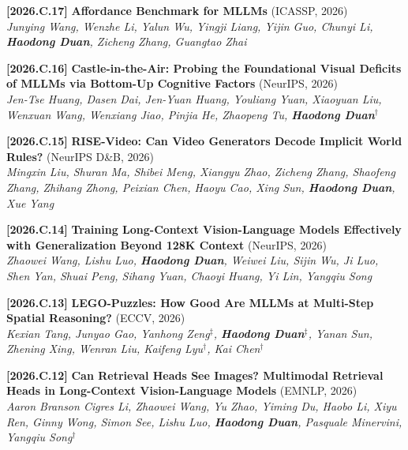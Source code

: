 \documentclass{resume}
\newcommand{\itemgap}{\vspace{-1mm}}%
\begin{document}
\textbf{[2026.C.17]} \textbf{Affordance Benchmark for MLLMs} (ICASSP, 2026) \\
\textit{Junying Wang, Wenzhe Li, Yalun Wu, Yingji Liang, Yijin Guo, Chunyi Li, \textbf{Haodong Duan}, Zicheng Zhang, Guangtao Zhai} \\

\itemgap

\textbf{[2026.C.16]} \textbf{Castle-in-the-Air: Probing the Foundational Visual Deficits of MLLMs via Bottom-Up Cognitive Factors} (NeurIPS, 2026) \\
\textit{Jen-Tse Huang, Dasen Dai, Jen-Yuan Huang, Youliang Yuan, Xiaoyuan Liu, Wenxuan Wang, Wenxiang Jiao, Pinjia He, Zhaopeng Tu, \textbf{Haodong Duan$^\dag$}} \\

\itemgap

\textbf{[2026.C.15]} \textbf{RISE-Video: Can Video Generators Decode Implicit World Rules?} (NeurIPS D\&B, 2026) \\
\textit{Mingxin Liu, Shuran Ma, Shibei Meng, Xiangyu Zhao, Zicheng Zhang, Shaofeng Zhang, Zhihang Zhong, Peixian Chen, Haoyu Cao, Xing Sun, \textbf{Haodong Duan}, Xue Yang} \\

\itemgap

\textbf{[2026.C.14]} \textbf{Training Long-Context Vision-Language Models Effectively with Generalization Beyond 128K Context} (NeurIPS, 2026) \\
\textit{Zhaowei Wang, Lishu Luo, \textbf{Haodong Duan}, Weiwei Liu, Sijin Wu, Ji Luo, Shen Yan, Shuai Peng, Sihang Yuan, Chaoyi Huang, Yi Lin, Yangqiu Song} \\

\itemgap

\textbf{[2026.C.13]} \textbf{LEGO-Puzzles: How Good Are MLLMs at Multi-Step Spatial Reasoning?} (ECCV, 2026) \\
\textit{Kexian Tang, Junyao Gao, Yanhong Zeng$^\ddag$, \textbf{Haodong Duan$^\ddag$}, Yanan Sun, Zhening Xing, Wenran Liu, Kaifeng Lyu$^\dag$, Kai Chen$^\dag$} \\

\itemgap

\textbf{[2026.C.12]} \textbf{Can Retrieval Heads See Images? Multimodal Retrieval Heads in Long-Context Vision-Language Models} (EMNLP, 2026) \\
\textit{Aaron Branson Cigres Li, Zhaowei Wang, Yu Zhao, Yiming Du, Haobo Li, Xiyu Ren, Ginny Wong, Simon See, Lishu Luo, \textbf{Haodong Duan}, Pasquale Minervini, Yangqiu Song$^\dag$} \\
\end{document}
